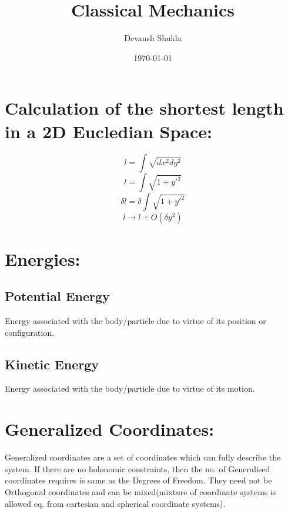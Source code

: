 \documentclass[a4paper]{article}
\title{Classical Mechanics}
\author{Devansh Shukla}
\date{\today}
\begin{document}
	\maketitle

	\section*{Calculation of the shortest length in a 2D Eucledian Space: }
		\noindent
		
		$$ l = \int \sqrt{dx^2 dy^2} $$
		$$ l = \int \sqrt{1 + y'^2} $$
		$$ {\delta}l = {\delta}\int \sqrt{1 + y'^2} $$
		$$ l \rightarrow l + O(\delta y^2) $$

	
	\section*{Energies: }
		\subsection*{Potential Energy}
			Energy associated with the body/particle due to virtue of its position or configuration.
		\subsection*{Kinetic Energy}
			Energy associated with the body/particle due to virtue of its motion.

	\section*{Generalized Coordinates: }
		\noindent

		Generalized coordinates are a set of coordinates which can fully describe the system. If there are no holonomic constraints, then the no. of Generalised coordinates requires is same as the Degrees of Freedom. They need not be Orthogonal coordinates and can be mixed(mixture of coordinate systems is allowed eq. from cartesian and spherical coordinate systems).
		
\end{document}
